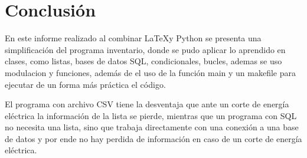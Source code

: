 \documentclass[12pt]{article}
\begin{document}
\section{Conclusión}

En este informe realizado al combinar \LaTeX y Python se presenta una simplificación del programa inventario, donde se pudo aplicar lo aprendido en clases, como listas, bases de datos SQL, condicionales, bucles, ademas se uso modulacion y funciones, además de el uso de la función main y un makefile para ejecutar de un forma más práctica el código.

El programa con archivo CSV tiene la desventaja que ante un corte de energía eléctrica la información de la lista se pierde, mientras que un programa con SQL no necesita una lista, sino que trabaja directamente con una conexión a una base de datos y por ende no hay perdida de información en caso de un corte de energía eléctrica.
\end{document}
